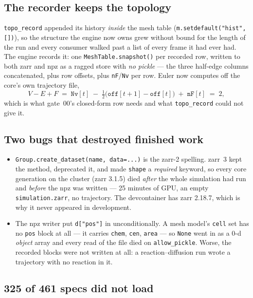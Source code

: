 \documentclass[11pt,a4paper]{article}
\newcommand{\code}[1]{\texttt{\small #1}}
\begin{document}
\subsection{The recorder keeps the topology}

\code{topo\_record} appended its history \emph{inside} the mesh table
(\code{m.setdefault("hist", [])}), so the structure the engine now owns grew without bound for the
length of the run and every consumer walked past a list of every frame it had ever had. The engine
records it: one \code{MeshTable.snapshot()} per recorded row, written to both zarr and npz as a
ragged store with \emph{no pickle} --- the three half-edge columns concatenated, plus row offsets,
plus \code{nF}/\code{Nv} per row. Euler now computes off the core's own trajectory file,
\[
  V - E + F \;=\; \mathtt{Nv}[t] \;-\; \tfrac{1}{2}\big(\mathtt{off}[t{+}1] - \mathtt{off}[t]\big)
  \;+\; \mathtt{nF}[t] \;=\; 2 ,
\]
which is what gate~00's closed-form row needs and what \code{topo\_record} could not give it.

\subsection{Two bugs that destroyed finished work}

\begin{itemize}
\item \code{Group.create\_dataset(name, data=...)} is the zarr-2 spelling. zarr~3 kept the method,
  deprecated it, and made \code{shape} a \emph{required} keyword, so every core generation on the
  cluster (zarr 3.1.5) died \emph{after} the whole simulation had run and \emph{before} the npz was
  written --- 25 minutes of GPU, an empty \code{simulation.zarr}, no trajectory. The devcontainer
  has zarr 2.18.7, which is why it never appeared in development.
\item The npz writer put \code{d["pos"]} in unconditionally. A mesh model's \code{cell} set has no
  \code{pos} block at all --- it carries \code{chem}, \code{cen}, \code{area} --- so \code{None} went
  in as a 0-d \emph{object} array and every read of the file died on \code{allow\_pickle}. Worse, the
  recorded blocks were not written at all: a reaction--diffusion run wrote a trajectory with no
  reaction in it.
\end{itemize}

\subsection{325 of 461 specs did not load}
\end{document}
